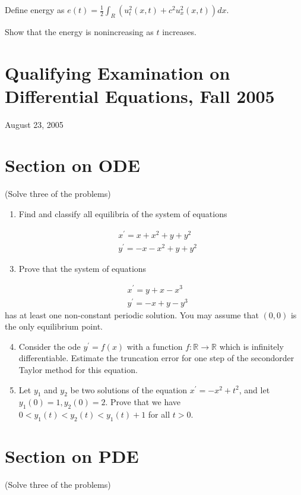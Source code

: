 \documentclass[10pt]{article}
\begin{document}
Define energy as $e(t)=\frac{1}{2} \int_{R}\left(u_{t}^{2}(x, t)+c^{2} u_{x}^{2}(x, t)\right) d x$.

Show that the energy is nonincreasing as $t$ increases.

\section*{Qualifying Examination on Differential Equations, Fall 2005 }
August 23, 2005

\section{Section on ODE}
(Solve three of the problems)

\begin{enumerate}
  \item Find and classify all equilibria of the system of equations
\end{enumerate}
$$
\begin{aligned}
&x^{\prime}=x+x^{2}+y+y^{2} \\
&y^{\prime}=-x-x^{2}+y+y^{2}
\end{aligned}
$$

\begin{enumerate}
  \setcounter{enumi}{2}
  \item Prove that the system of equations
\end{enumerate}
$$
\begin{aligned}
&x^{\prime}=y+x-x^{3} \\
&y^{\prime}=-x+y-y^{3}
\end{aligned}
$$
has at least one non-constant periodic solution. You may assume that $(0,0)$ is the only equilibrium point.

\begin{enumerate}
  \setcounter{enumi}{3}
  \item Consider the ode $y^{\prime}=f(x)$ with a function $f: \mathbb{R} \rightarrow \mathbb{R}$ which is infinitely differentiable. Estimate the truncation error for one step of the secondorder Taylor method for this equation.

  \item Let $y_{1}$ and $y_{2}$ be two solutions of the equation $x^{\prime}=-x^{2}+t^{2}$, and let $y_{1}(0)=1, y_{2}(0)=2$. Prove that we have $0<y_{1}(t)<y_{2}(t)<y_{1}(t)+1$ for all $t>0$.

\end{enumerate}
\section{Section on PDE}
(Solve three of the problems)
\end{document}
